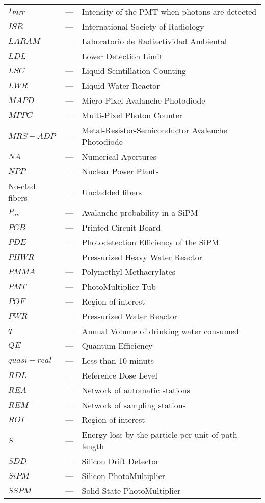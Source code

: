 \begin{longtable}{p{25mm} c p{120mm} }
$I_{PMT}$ & --- & Intensity of the PMT when photons are detected\\
$ISR$ & --- & International Society of Radiology \\
$LARAM$ & --- & Laboratorio de Radiactividad Ambiental\\
$LDL$ & --- & Lower Detection Limit\\
$LSC$ & --- & Liquid Scintillation Counting\\
$LWR$ & --- & Liquid Water Reactor\\
$MAPD$ & --- & Micro-Pixel Avalanche Photodiode\\
$MPPC$ & --- & Multi-Pixel Photon Counter\\
$MRS-ADP$ & --- & Metal-Resistor-Semiconductor Avalenche Photodiode\\
$NA$ & --- & Numerical Apertures\\
$NPP$ & --- & Nuclear Power Plants\\
No-clad fibers & --- & Uncladded fibers\\
$P_{av}$ & --- & Avalanche probability in a SiPM\\
$PCB$ & --- & Printed Circuit Board\\
$PDE$ & --- & Photodetection Efficiency of the SiPM\\
$PHWR$ & --- & Pressurized Heavy Water Reactor\\
$PMMA$ & --- & Polymethyl Methacrylates\\
$PMT$ & --- & PhotoMultiplier Tub\\
$POF$ & --- & Region of interest\\
$PWR$ & --- & Pressurized Water Reactor\\
$q$ & --- & Annual Volume of drinking water consumed\\
$QE$ & --- & Quantum Efficiency\\
$quasi-real$ & --- & Less than 10 minuts\\
$RDL$ & --- & Reference Dose Level\\
$REA$ & --- & Network of automatic stations\\
$REM$ & --- & Network of sampling stations\\
$ROI$ & --- & Region of interest\\
$S$ & --- & Energy loss by the particle per unit of path length\\
$SDD$ & --- & Silicon Drift Detector\\
$SiPM$ & --- & Silicon PhotoMultiplier\\
$SSPM$ & --- & Solid State PhotoMultiplier\\

\end{longtable}
